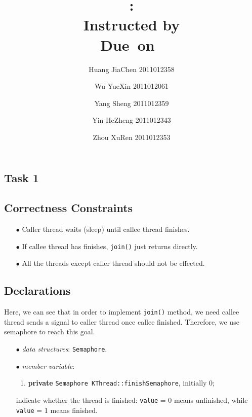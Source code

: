 \documentclass{article}
\title{\textmd{\bf \Class: \Title}\\{\large Instructed by \textit{\ClassInstructor}}\\\normalsize\vspace{0.1in}\small{Due\ on\ \DueDate}}
\date{}
\author{%
  Huang JiaChen 2011012358 \and
  Wu YueXin 2011012061 \and
  Yang Sheng 2011012359 \and
  Yin HeZheng 2011012343 \and
  Zhou XuRen 2011012353}
\begin{document}
  \begin{spacing}{1.1}
    \maketitle \thispagestyle{empty}


\theoremstyle{plain} \newtheorem{computational}{Definition}
    \section{Task 1}

    \subsection{Correctness Constraints}
    \begin{enumerate}
      \item[$\bullet$] Caller thread waits (sleep) until callee thread finishes.
      \item[$\bullet$] If callee thread has finishes, \texttt{join()} just returns
	directly.
      \item[$\bullet$] All the threads except caller thread should not be effected.
    \end{enumerate}

    \subsection{Declarations}
    Here, we can see that in order to implement \texttt{join()} method, we need callee
    thread sends a signal to caller thread once callee finished. Therefore, we use
    semaphore to reach this goal.
    \begin{enumerate}
      \item[$\bullet$] \textit{data structures}: \texttt{Semaphore}.
      \item[$\bullet$] \textit{member variable}:
	\begin{enumerate}
	  \item \textbf{private} \texttt{Semaphore KThread::finishSemaphore}, initially 0;
	\end{enumerate}
	indicate whether the thread is finished: \texttt{value} = 0 means unfinished, while
	\texttt{value} = 1 means finished.

    \end{enumerate}


\end{spacing}
\end{document}
